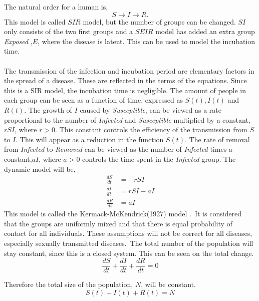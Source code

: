\documentclass[%
twoside,                 %
final,                   %
chapterprefix=true,      %
open=right               %
10pt]{book}
\begin{document}
\noindent
The natural order for a human is,
\begin{equation}
S \rightarrow I \rightarrow R.
\end{equation}
This model is called $SIR$ model, but the number of groups can be changed. $SI$ only consists of the two first groups and a $SEIR$ model has added an extra group \emph{Exposed} ,$E$, where the disease is latent. This can be used to model the incubation time. 
\\
\\
The transmission of the infection and incubation period are elementary factors in the spread of a disease. These are reflected in the terms of the equations. Since this is a SIR model, the incubation time is negligible. The amount of people in each group can be seen as a function of time, expressed as $S(t),I(t)$ and $R(t)$. The growth of $I$ caused by \emph{Susceptible}, can be viewed as a rate proportional to the number of \emph{Infected} and \emph{Susceptible} multiplied by a constant,$rSI$, where $r>0$. This constant controls the efficiency of the transmission from $S$ to $I$. This will appear as a reduction in the function $S(t)$. The rate of removal from \emph{Infected} to \emph{Removed} can be viewed as the number of \emph{Infected} times a constant,$aI$, where $a>0$ controls the time spent in the \emph{Infected} group. The dynamic model will be,
\begin{equation} \label{eq:SIR_model}
	\begin{aligned} 
	\frac{dS}{dt} &= -rSI \\ 
	\frac{dI}{dt} &= rSI-aI \\ 
	\frac{dR}{dt} &= aI 
	\end{aligned}
\end{equation}
This model is called the Kermack-McKendrick(1927) model \cite[p.~320]{murray2002mathematical}.~It is considered that the groups are uniformly mixed and that there is equal probability of contact for all individuals. These assumptions will not be correct for all diseases, especially sexually transmitted diseases. The total number of the population will stay constant, since this is a closed system. This can be seen on the total change.
\begin{equation}
\frac{dS}{dt} + \frac{dI}{dt} + \frac{dR}{dt} = 0
\end{equation}

Therefore the total size of the population, $N$, will be constant. 
\begin{equation} \label{eq:SIR_N}
S(t)+I(t)+R(t) = N
\end{equation}
\end{document}
